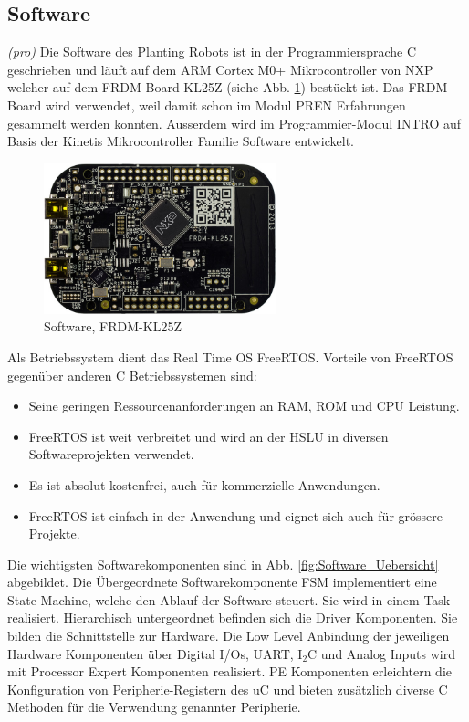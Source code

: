 \subsection{Software} \label{kap:Software}

\textit{(pro)} Die Software des Planting Robots ist in der Programmiersprache C geschrieben und läuft auf dem ARM Cortex M0+ Mikrocontroller von NXP welcher auf dem FRDM-Board KL25Z (siehe Abb. \ref{fig:FRDM-KL25Z}) bestückt ist. Das FRDM-Board wird verwendet, weil damit schon im Modul PREN Erfahrungen gesammelt werden konnten. Ausserdem wird im Programmier-Modul INTRO auf Basis der Kinetis Mikrocontroller Familie Software entwickelt.

\begin{figure}[H]
	\includegraphics[width=0.6\textwidth]{Illustrationen/5-Konzept/FRDM-KL25Z.jpg}
	\caption{Software, FRDM-KL25Z \protect\cite{NXP}}
	\label{fig:FRDM-KL25Z}
\end{figure}

Als Betriebssystem dient das Real Time OS FreeRTOS. Vorteile von FreeRTOS gegenüber anderen C Betriebssystemen sind:

\begin{itemize}
	\item Seine geringen Ressourcenanforderungen an RAM, ROM und CPU Leistung. 
	\item FreeRTOS ist weit verbreitet und wird an der HSLU in diversen Softwareprojekten verwendet.
	\item Es ist absolut kostenfrei, auch für kommerzielle Anwendungen.
	\item FreeRTOS ist einfach in der Anwendung und eignet sich auch für grössere Projekte.
\end{itemize}

Die wichtigsten Softwarekomponenten sind in Abb. \ref{fig:Software_Uebersicht} abgebildet. Die Übergeordnete Softwarekomponente FSM implementiert eine State Machine, welche den Ablauf der Software steuert. Sie wird in einem Task realisiert. Hierarchisch untergeordnet befinden sich die Driver Komponenten. Sie bilden die Schnittstelle zur Hardware. Die Low Level Anbindung der jeweiligen Hardware Komponenten über Digital I/Os, UART, I$_{2}$C und Analog Inputs wird mit Processor Expert Komponenten realisiert. PE Komponenten erleichtern die Konfiguration von Peripherie-Registern des uC und bieten zusätzlich diverse C Methoden für die Verwendung genannter Peripherie. 


